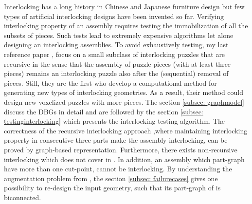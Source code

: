 Interlocking has a long history in Chinese and Japanese furniture design but few types of artificial interlocking designs have been invented so far. Verifying interlocking property of an assembly requires testing the immobilization of all the subsets of pieces. Such tests lead to extremely expensive algorithms let alone designing an interlocking assemblies. To avoid exhaustively testing, my last reference paper \cite{Song-2012-InterCubes}, focus on a small subclass of interlocking puzzles that are recursive in the sense that the assembly of puzzle pieces (with at least three pieces) remains an interlocking puzzle also after the (sequential) removal of pieces. Still, they are the first who develop a computational method for generating new types of interlocking geometries. As a result, their method could design new voxelized puzzles with more pieces. 
\newpage
The section \ref{subsec: graphmodel} discuss the DBGs in detail and are followed by the section \ref{subsec: testinginterlocking} which presents the interlocking testing algorithm. The correctness of the recursive interlocking approach \cite{Song-2012-InterCubes},where maintaining  interlocking property in consecutive three parts make the assembly interlocking, can be proved by graph-based representation. Furthermore, there exists non-recursive interlocking which does not cover in \cite{Song-2012-InterCubes}. In addition, an assembly which part-graph have more than one cut-point,  cannot be interlocking. By understanding the augmentation problem from \cite{Tarjan-1972-SCC}, the section \ref{subsec: failurecases} gives one possibility to re-design the input geometry, such that its part-graph of is biconnected. 
